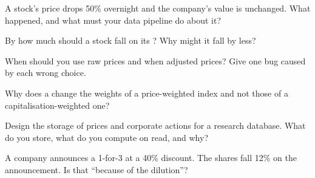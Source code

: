 \begin{interviewq}\label{iq:m1:shares-corporate-actions-indices:1}
A stock's price drops 50\% overnight and the company's value is unchanged.
What happened, and what must your data pipeline do about it?
\end{interviewq}

\begin{interviewq}\label{iq:m1:shares-corporate-actions-indices:2}
By how much should a stock fall on its ? Why might it fall by
less?
\end{interviewq}

\begin{interviewq}\label{iq:m1:shares-corporate-actions-indices:3}
When should you use raw prices and when adjusted prices? Give one bug caused
by each wrong choice.
\end{interviewq}

\begin{interviewq}\label{iq:m1:shares-corporate-actions-indices:4}
Why does a  change the weights of a price-weighted index and not
those of a capitalisation-weighted one?
\end{interviewq}

\begin{interviewq}\label{iq:m1:shares-corporate-actions-indices:5}
Design the storage of prices and corporate actions for a research database.
What do you store, what do you compute on read, and why?
\end{interviewq}

\begin{interviewq}\label{iq:m1:shares-corporate-actions-indices:6}
A company announces a 1-for-3  at a 40\% discount. The shares
fall 12\% on the announcement. Is that ``because of the dilution''?
\end{interviewq}
